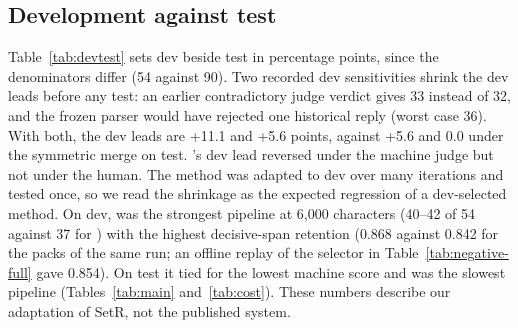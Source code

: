 

\subsection{Development against test}
Table~\ref{tab:devtest} sets dev beside test in percentage points, since the denominators differ (54 against 90). Two recorded dev sensitivities shrink the dev leads before any test: an earlier contradictory judge verdict gives \hr{} 33 instead of 32, and the frozen parser would have rejected one historical \lexb{} reply (worst case 36). With both, the dev leads are +11.1 and +5.6 points, against +5.6 and 0.0 under the symmetric merge on test. \setr's dev lead reversed under the machine judge but not under the human. The method was adapted to dev over many iterations and tested once, so we read the shrinkage as the expected regression of a dev-selected method. On dev, \setr{} was the strongest pipeline at 6,000 characters (40--42 of 54 against 37 for \lexb) with the highest decisive-span retention (0.868 against 0.842 for the \lexb{} packs of the same run; an offline replay of the \lexb{} selector in Table~\ref{tab:negative-full} gave 0.854). On test it tied \hybrid{} for the lowest machine score and was the slowest pipeline (Tables~\ref{tab:main} and~\ref{tab:cost}). These numbers describe our adaptation of SetR, not the published system.


